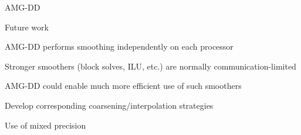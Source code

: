 \documentclass[18pt,xcolor=table]{beamer}
\begin{document}
\begin{frame}{AMG-DD}
\begin{block}{Future work}
\bit
\item AMG-DD performs smoothing independently on each processor
\bit
\item Stronger smoothers (block solves, ILU, etc.) are normally communication-limited
\item AMG-DD could enable much more efficient use of such smoothers
\eit
\item Develop corresponding coarsening/interpolation strategies 
\item Use of mixed precision
\eit
\end{block}
\end{frame}

\end{document}
